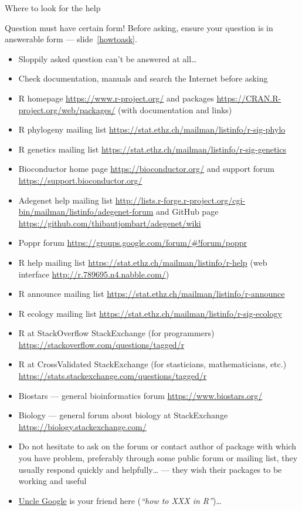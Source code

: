 \documentclass[compress, ucs, xelatex, 11pt, xcolor=svgnames, aspectratio=169,
	hyperref={
		bookmarks=true,
		unicode=true,
		colorlinks=true,
		pdftitle={Molecular data in R},
		plainpages=false,
		pdfauthor={Vojtech Zeisek},
		pdfsubject={Course about phylogeny and evolution in R},
		pdfcreator={XeLaTeX},
		pdfkeywords={R, evolution, phylogeny, molecular data},
		linkcolor=Crimson, %
		anchorcolor=Magenta, %
		citecolor=Magenta, %
		filecolor=Magenta, %
		menucolor=Magenta, %
		urlcolor=DodgerBlue, %
		pdftex},
	url={hyphens, lowtilde} %
	]{beamer}
\begin{document}
\begin{frame}[allowframebreaks]{Where to look for the help}
	\label{help}
	\begin{alertblock}{Question must have certain form!}
			Before asking, \alert{ensure your question is in answerable form} --- slide~\ref{howtoask}.
		\begin{itemize}
			\item Sloppily asked question can't be answered at all\ldots
			\item Check documentation, manuals and search the Internet before asking
		\end{itemize}
	\end{alertblock}
	\begin{itemize}
		\item R homepage \url{https://www.r-project.org/} and packages \url{https://CRAN.R-project.org/web/packages/} (with documentation and links)
		\item R phylogeny mailing list \url{https://stat.ethz.ch/mailman/listinfo/r-sig-phylo}
		\item R genetics mailing list \url{https://stat.ethz.ch/mailman/listinfo/r-sig-genetics}
		\item Bioconductor home page \url{https://bioconductor.org/} and support forum \url{https://support.bioconductor.org/}
		\item Adegenet help mailing list \url{http://lists.r-forge.r-project.org/cgi-bin/mailman/listinfo/adegenet-forum} and GitHub page \url{https://github.com/thibautjombart/adegenet/wiki}
		\item Poppr forum \url{https://groups.google.com/forum/\#!forum/poppr}
		\item R help mailing list \url{https://stat.ethz.ch/mailman/listinfo/r-help} (web interface \url{http://r.789695.n4.nabble.com/})
		\item R announce mailing list \url{https://stat.ethz.ch/mailman/listinfo/r-announce}
		\item R ecology mailing list \url{https://stat.ethz.ch/mailman/listinfo/r-sig-ecology}
		\item R at StackOverflow StackExchange (for programmers) \url{https://stackoverflow.com/questions/tagged/r}
		\item R at CrossValidated StackExchange (for stasticians, mathematicians, etc.) \url{https://stats.stackexchange.com/questions/tagged/r}
		\item Biostars --- general bioinformatics forum \url{https://www.biostars.org/}
		\item Biology --- general forum about biology at StackExchange \url{https://biology.stackexchange.com/}
		\item Do not hesitate to ask on the forum or contact author of package with which you have problem, preferably through some public forum or mailing list, they usually respond quickly and helpfully\ldots{ }--- they wish their packages to be working and useful
		\item \href{http://rseek.org/}{Uncle Google} is your friend here (\textit{\enquote{how to XXX in R}})\ldots
	\end{itemize}
\end{frame}
\end{document}
